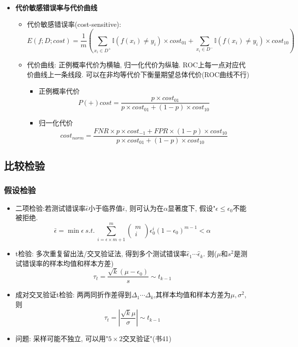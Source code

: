 \documentclass[UTF8]{article}
\begin{document}
\begin{itemize}
\begin{itemize}
	\item \textbf{代价敏感错误率与代价曲线}
		\begin{itemize}
		\item 代价敏感错误率(cost-sensitive):
			$$E(f;D;cost)=\frac{1}{m}\left(\sum\limits_{x_i\in D^+}\mathbb{I}(f(x_i)\not=y_i)\times cost_{01}+\sum\limits_{x_i\in D^-}\mathbb{I}(f(x_i)\not=y_i)\times cost_{10}\right)$$
		\item 代价曲线: 正例概率代价为横轴, 归一化代价为纵轴. ROC上每一点对应代价曲线上一条线段. 可以在非均等代价下衡量期望总体代价(ROC曲线不行)
			\begin{itemize}
			\item 正例概率代价
				$$P(+)cost=\frac{p\times cost_{01}}{p\times cost_{01}+(1-p)\times cost_{10}}$$
			\item 归一化代价
				$$cost_{norm}=\frac{FNR\times p\times cost_{-1}+FPR\times(1-p)\times cost_{10}}{p\times cost_{01}+(1-p)\times cost_{10}}$$
			\end{itemize}
		\end{itemize}
	\end{itemize}
\end{itemize}

\subsection{比较检验}
\subsubsection{假设检验}
\begin{itemize}
\item 二项检验:若测试错误率$\hat{\epsilon}$小于临界值$\bar{\epsilon}$, 则可认为在$\alpha$显著度下, 假设"$\epsilon\le\epsilon_0$不能被拒绝.
	$$\bar{\epsilon}=\min\epsilon\ s.t.\ \sum\limits_{i=\epsilon\times m+1}^m\left(\begin{array}{c}m\\i\end{array}\right)\epsilon_0^i(1-\epsilon_0)^{m-1}<\alpha$$
\item t检验: 多次重复留出法/交叉验证法, 得到多个测试错误率$\hat{\epsilon}_1\cdots\hat{\epsilon}_k$. 则($\mu$和$s^2$是测试错误率的样本均值和样本方差)$$\tau_t=\frac{\sqrt{k}(\mu-\epsilon_0)}{s}\sim t_{k-1}$$
\item 成对交叉验证t检验: 两两同折作差得到$\Delta_1\cdots\Delta_k$,其样本均值和样本方差为$\mu,\sigma^2$,则$$\tau_t=\left|\frac{\sqrt{k}\mu}{\sigma}\right|\sim t_{k-1}$$
\item 问题: 采样可能不独立, 可以用"$5\times 2$交叉验证"(书41)
\end{itemize}
\end{document}
